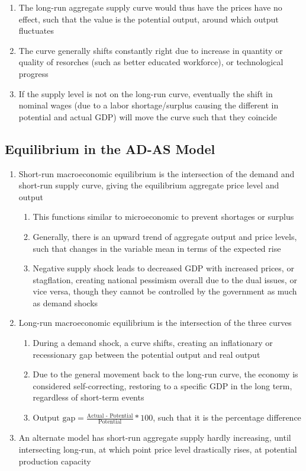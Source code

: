 \documentclass[11 pt, twoside]{article}
\begin{document}
\begin{enumerate}
\begin{enumerate}
\item The long-run aggregate supply curve would thus have the prices have no effect, such that the value is the potential output, around which output fluctuates
\item The curve generally shifts constantly right due to increase in quantity or quality of resorches (such as better educated workforce), or technological progress
\item If the supply level is not on the long-run curve, eventually the shift in nominal wages (due to a labor shortage/surplus causing the different in potential and actual GDP) will move the curve such that they coincide
\end{enumerate}
\end{enumerate}

\subsection{Equilibrium in the AD-AS Model}
\begin{enumerate}
\item Short-run macroeconomic equilibrium is the intersection of the demand and short-run supply curve, giving the equilibrium aggregate price level and output
\begin{enumerate}
\item This functions similar to microeconomic to prevent shortages or surplus
\item Generally, there is an upward trend of aggregate output and price levels, such that changes in the variable mean in terms of the expected rise
\item Negative supply shock leads to decreased GDP with increased prices, or stagflation, creating national pessimism overall due to the dual issues, or vice versa, though they cannot be controlled by the government as much as demand shocks 
\end{enumerate}
\item Long-run macroeconomic equilibrium is the intersection of the three curves 
\begin{enumerate}
\item During a demand shock, a curve shifts, creating an inflationary or recessionary gap between the potential output and real output
\item Due to the general movement back to the long-run curve, the economy is considered self-correcting, restoring to a specific GDP in the long term, regardless of short-term events
\item $\text{Output gap} = \frac{\text{Actual - Potential}}{\text{Potential}}*100$, such that it is the percentage difference
\end{enumerate}
\item An alternate model has short-run aggregate supply hardly increasing, until intersecting long-run, at which point price level drastically rises, at potential production capacity
\end{enumerate}
\end{document}
